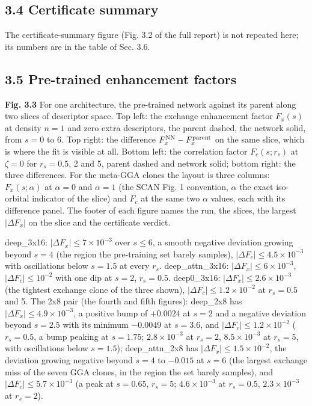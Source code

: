 \documentclass[10pt,a4paper]{article}
\begin{document}
\subsection*{3.4 Certificate summary}

The certificate-summary figure (Fig. 3.2 of the full report) is not repeated here; its numbers are in the table of Sec. 3.6.

\subsection*{3.5 Pre-trained enhancement factors}

\textbf{Fig. 3.3} For one architecture, the pre-trained network against its parent along two slices of descriptor space. Top left: the exchange enhancement factor $F_x(s)$ at density $n = 1$ and zero extra descriptors, the parent dashed, the network solid, from $s = 0$ to 6. Top right: the difference $F_x^{\rm NN} - F_x^{\rm parent}$ on the same slice, which is where the fit is visible at all. Bottom left: the correlation factor $F_c(s; r_s)$ at $\zeta = 0$ for $r_s = 0.5$, 2 and 5, parent dashed and network solid; bottom right: the three differences. For the meta-GGA clones the layout is three columns: $F_x(s; \alpha)$ at $\alpha = 0$ and $\alpha = 1$ (the SCAN Fig. 1 convention, $\alpha$ the exact iso-orbital indicator of the slice) and $F_c$ at the same two $\alpha$ values, each with its difference panel. The footer of each figure names the run, the slices, the largest $|\Delta F_x|$ on the slice and the certificate verdict.

deep\_3x16: $|\Delta F_x| \le 7 \times 10^{-3}$ over $s \le 6$, a smooth negative deviation growing beyond $s = 4$ (the region the pre-training set barely samples), $|\Delta F_c| \le 4.5 \times 10^{-3}$ with oscillations below $s = 1.5$ at every $r_s$. deep\_attn\_3x16: $|\Delta F_x| \le 6 \times 10^{-3}$, $|\Delta F_c| \le 10^{-2}$ with one dip at $s = 2$, $r_s = 0.5$. deep0\_3x16: $|\Delta F_x| \le 2.6 \times 10^{-3}$ (the tightest exchange clone of the three shown), $|\Delta F_c| \le 1.2 \times 10^{-2}$ at $r_s = 0.5$ and 5. The 2x8 pair (the fourth and fifth figures): deep\_2x8 has $|\Delta F_x| \le 4.9 \times 10^{-3}$, a positive bump of $+0.0024$ at $s = 2$ and a negative deviation beyond $s = 2.5$ with its minimum $-0.0049$ at $s = 3.6$, and $|\Delta F_c| \le 1.2 \times 10^{-2}$ ($r_s = 0.5$, a bump peaking at $s = 1.75$; $2.8 \times 10^{-3}$ at $r_s = 2$, $8.5 \times 10^{-3}$ at $r_s = 5$, with oscillations below $s = 1.5$); deep\_attn\_2x8 has $|\Delta F_x| \le 1.5 \times 10^{-2}$, the deviation growing negative beyond $s = 4$ to $-0.015$ at $s = 6$ (the largest exchange miss of the seven GGA clones, in the region the set barely samples), and $|\Delta F_c| \le 5.7 \times 10^{-3}$ (a peak at $s = 0.65$, $r_s = 5$; $4.6 \times 10^{-3}$ at $r_s = 0.5$, $2.3 \times 10^{-3}$ at $r_s = 2$).
\end{document}
